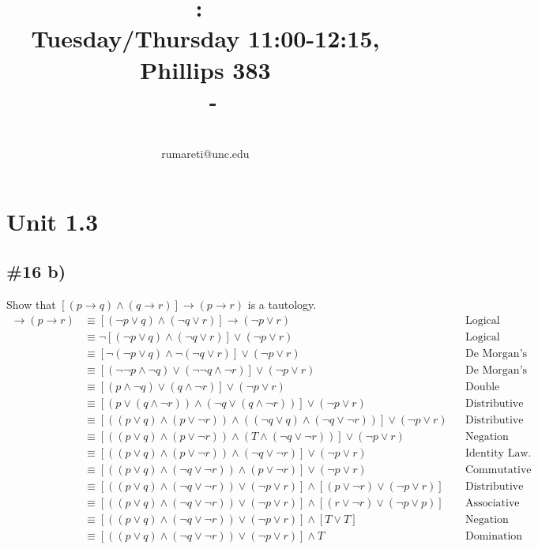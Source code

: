 \documentclass{article}
\title{
    \vspace{2in}
    \textmd{\textbf{\hmwkClass:\ \hmwkTitle}}\\
    \normalsize\vspace{0.1in}\small{Tuesday/Thursday 11:00-12:15, Phillips 383}\\
    \vspace{0.1in}\large{\textit{\hmwkClassInstructor\ - \hmwkClassTime}}
    \vspace{3in}
}
\author{\hmwkAuthorName\\\small{rumareti@unc.edu}}
\date{}
\newcommand{\unit}[1]{\section{Unit #1}}
\newcommand{\problem}[1]{\subsection{\##1}}
\renewcommand{\And}{\wedge}
\newcommand{\Or}{\vee}
\begin{document}
\maketitle

\pagebreak

\unit{1.3}
\problem{16 b)}
Show that \([(p \rightarrow q) \And (q \rightarrow r)] \rightarrow (p \rightarrow r)\) is a tautology.
\begin{align*}
    [(p \rightarrow q) \And (q \rightarrow r)] \rightarrow (p \rightarrow r) &\equiv [(\neg p \Or q) \And (\neg q \Or r)] \rightarrow (\neg p \Or r) && \text{Logical equivalence.}\\
    &\equiv \neg [(\neg p \Or q) \And (\neg q \Or r)] \Or (\neg p \Or r) && \text{Logical equivalence.}\\
    &\equiv [\neg(\neg p \Or q) \And \neg( \neg q \Or r)] \Or (\neg p \Or r) && \text{De Morgan's Law.}\\
    &\equiv [(\neg \neg p \And \neg q) \Or (\neg \neg q \And \neg r)] \Or (\neg p \Or r) && \text{De Morgan's Law.}\\
    &\equiv [(p \And \neg q) \Or (q \And \neg r)] \Or (\neg p \Or r) && \text{Double Negation.}\\
    &\equiv [(p \Or (q \And \neg r)) \And (\neg q \Or (q \And \neg r))] \Or (\neg p \Or r) && \text{Distributive Law.}\\
    &\equiv [((p \Or q) \And (p \Or \neg r)) \And ((\neg q \Or q) \And (\neg q \Or \neg r))] \Or (\neg p \Or r) && \text{Distributive Law.}\\
    &\equiv [((p \Or q) \And (p \Or \neg r)) \And (T \And (\neg q \Or \neg r))] \Or (\neg p \Or r) && \text{Negation Law.}\\
    &\equiv [((p \Or q) \And (p \Or \neg r)) \And (\neg q \Or \neg r)] \Or (\neg p \Or r) && \text{Identity Law.}\\
    &\equiv [((p \Or q) \And (\neg q \Or \neg r)) \And (p \Or \neg r)] \Or (\neg p \Or r) && \text{Commutative Law.}\\
    &\equiv [((p \Or q) \And (\neg q \Or \neg r)) \Or (\neg p \Or r)] \And [(p \Or \neg r) \Or (\neg p \Or r)] && \text{Distributive Law.}\\
    &\equiv [((p \Or q) \And (\neg q \Or \neg r)) \Or (\neg p \Or r)] \And [(r \Or \neg r) \Or (\neg p \Or p)] && \text{Associative Law.}\\
    &\equiv [((p \Or q) \And (\neg q \Or \neg r)) \Or (\neg p \Or r)] \And [T \Or T] && \text{Negation Law.}\\
    &\equiv [((p \Or q) \And (\neg q \Or \neg r)) \Or (\neg p \Or r)] \And T && \text{Domination Law.}\\

\end{align*}
\end{document}
